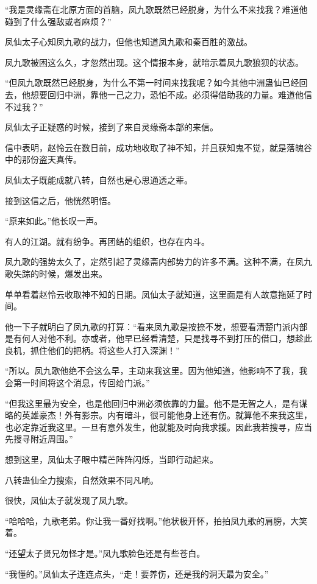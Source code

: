 \begin{this_body}
“我是灵缘斋在北原方面的首脑，凤九歌既然已经脱身，为什么不来找我？难道他碰到了什么强敌或者麻烦？”

凤仙太子心知凤九歌的战力，但他也知道凤九歌和秦百胜的激战。

凤九歌被困这么久，才忽然出现。这个情报本身，就暗示着凤九歌狼狈的状态。

“但凤九歌既然已经脱身，为什么不第一时间来找我呢？如今其他中洲蛊仙已经回去，他想要回归中洲，靠他一己之力，恐怕不成。必须得借助我的力量。难道他信不过我？”

凤仙太子正疑惑的时候，接到了来自灵缘斋本部的来信。

信中表明，赵怜云在数日前，成功地收取了神不知，并且获知鬼不觉，就是落魄谷中的那份盗天真传。

凤仙太子既能成就八转，自然也是心思通透之辈。

接到这信之后，他恍然明悟。

“原来如此。”他长叹一声。

有人的江湖。就有纷争。再团结的组织，也存在内斗。

凤九歌的强势太久了，定然引起了灵缘斋内部势力的许多不满。这种不满，在凤九歌失踪的时候，爆发出来。

单单看着赵怜云收取神不知的日期。凤仙太子就知道，这里面是有人故意拖延了时间。

他一下子就明白了凤九歌的打算：“看来凤九歌是按捺不发，想要看清楚门派内部是有何人对他不利。亦或者，他早已经看清楚，只是找寻不到打压的借口，想趁此良机，抓住他们的把柄。将这些人打入深渊！”

“所以。凤九歌他绝不会这么早，主动来我这里。因为他知道，他影响不了我，我会第一时间将这个消息，传回给门派。”

“但我这里最为安全，也是他回归中洲必须依靠的力量。他不是无智之人，是有谋略的英雄豪杰！外有影宗。内有暗斗，很可能他身上还有伤。就算他不来我这里，也必定靠近我这里。一旦有意外发生，他就能及时向我求援。因此我若搜寻，应当先搜寻附近周围。”

想到这里，凤仙太子眼中精芒阵阵闪烁，当即行动起来。

八转蛊仙全力搜索，自然效果不同凡响。

很快，凤仙太子就发现了凤九歌。

“哈哈哈，九歌老弟。你让我一番好找啊。”他状极开怀，拍拍凤九歌的肩膀，大笑着。

“还望太子贤兄勿怪才是。”凤九歌脸色还是有些苍白。

“我懂的。”凤仙太子连连点头，“走！要养伤，还是我的洞天最为安全。”


\end{this_body}
